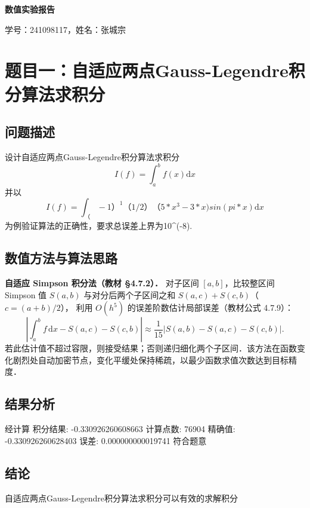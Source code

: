 \documentclass[UTF8,a4paper,11pt]{article}
\begin{document}
\begin{center}
{\huge \textbf{数值实验报告}}

\vspace{0.3cm}
{\large 学号：241098117\quad，姓名：张城宗\quad}
\end{center}

\section{题目一：自适应两点Gauss-Legendre积分算法求积分}

\subsection{问题描述}

设计自适应两点Gauss-Legendre积分算法求积分
$$ I(f) = \int_a^b f(x) \mathrm{d}x $$
并以$$ I(f) = \int_（-1）^1 （1/2）（5*x^3-3*x)sin(pi*x)\mathrm{d}x $$为例验证算法的正确性，要求总误差上界为10^(-8).

\subsection{数值方法与算法思路}


\noindent\textbf{自适应 Simpson 积分法（教材 §4.7.2）．}
对子区间 $[a,b]$，比较整区间 Simpson 值 $S(a,b)$ 与对分后两个子区间之和 $S(a,c)+S(c,b)$（$c=(a+b)/2$），
利用 $O(h^5)$ 的误差阶数估计局部误差（教材公式 4.7.9）：
$$\left|\int_a^b f\,\mathrm{d}x - S(a,c)-S(c,b)\right|\approx\frac{1}{15}|S(a,b)-S(a,c)-S(c,b)|.$$
若此估计值不超过容限，则接受结果；否则递归细化两个子区间．该方法在函数变化剧烈处自动加密节点，变化平缓处保持稀疏，以最少函数求值次数达到目标精度．

\subsection{结果分析}
经计算
积分结果: -0.330926260608663
计算点数: 76904
精确值: -0.330926260628403
误差: 0.000000000019741
符合题意


\subsection{结论}
自适应两点Gauss-Legendre积分算法求积分可以有效的求解积分

\clearpage

\end{document}
